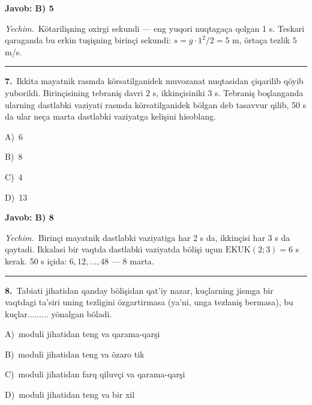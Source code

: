 \documentclass[11pt,a4paper]{article}
\newcommand{\opt}[2]{\hspace*{4mm}#1)\ #2\par}
\begin{document}
\noindent\colorbox{gray!12}{\parbox{\dimexpr\linewidth-2\fboxsep}{\textbf{Javob: B) 5}}}\par\smallskip
\noindent\textit{Yechim.}\ Kötarilişning oxirgi sekundi — eng yuqori nuqtagaça qolgan 1 s. Teskari qaraganda bu erkin tuşişning birinçi sekundi: $s=g\cdot1^2/2=5$ m, örtaça tezlik $5$ m/s.\par\par\medskip\hrule\medskip
{}\noindent\begin{minipage}{\linewidth}
\textbf{7.}\ Ikkita mayatnik rasmda körsatilganidek muvozanat nuqtasidan çiqarilib qöyib yuborildi. Birinçisining tebraniş davri 2 s, ikkinçisiniki 3 s. Tebraniş boşlanganda ularning dastlabki vaziyati rasmda körsatilganidek bölgan deb tasavvur qilib, 50 s da ular neça marta dastlabki vaziyatga kelişini hisoblang.\par\smallskip
\noindent\hspace*{4mm}\par\smallskip
\opt{A}{6}
\opt{B}{8}
\opt{C}{4}
\opt{D}{13}
\end{minipage}\vspace{2pt}\par
\noindent\colorbox{gray!12}{\parbox{\dimexpr\linewidth-2\fboxsep}{\textbf{Javob: B) 8}}}\par\smallskip
\noindent\textit{Yechim.}\ Birinçi mayatnik dastlabki vaziyatiga har 2 s da, ikkinçisi har 3 s da qaytadi. Ikkalasi bir vaqtda dastlabki vaziyatda bölişi uçun $\mathrm{EKUK}(2;3)=6$ s kerak. 50 s içida: $6, 12, \ldots, 48$ — 8 marta.\par\par\medskip\hrule\medskip
{}\noindent\begin{minipage}{\linewidth}
\textbf{8.}\ Tabiati jihatidan qanday bölişidan qat’iy nazar, kuçlarning jismga bir vaqtdagi ta’siri uning tezligini özgartirmasa (ya’ni, unga tezlaniş bermasa), bu kuçlar......... yönalgan böladi.\par\smallskip
\opt{A}{moduli jihatidan teng va qarama-qarşi}
\opt{B}{moduli jihatidan teng va özaro tik}
\opt{C}{moduli jihatidan farq qiluvçi va qarama-qarşi}
\opt{D}{moduli jihatidan teng va bir xil}
\end{minipage}\vspace{2pt}\par
\end{document}
